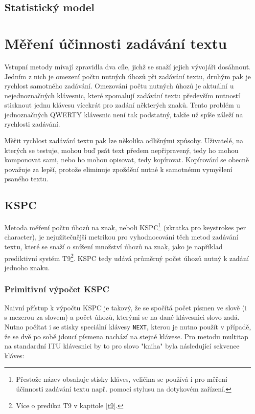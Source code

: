 \documentclass[a4paper,11pt]{article}
\begin{document}
\subsection{Statistický model}


\section{Měření účinnosti zadávání textu}

Vstupní metody mívají zpravidla dva cíle, jichž se snaží jejich vývojáři dosáhnout. Jedním z nich je omezení počtu nutných úhozů při zadávání textu, druhým pak je rychlost samotného zadávání. Omezování počtu nutných úhozů je aktuální u nejednoznačných klávesnic, které zpomalují zadávání textu především nutností stisknout jednu klávesu vícekrát pro zadání některých znaků. Tento problém u jednoznačných QWERTY klávesnic není tak podstatný, takže už spíše záleží na rychlosti zadávání.

Měřit rychlost zadávání textu pak lze několika odlišnými způsoby. Uživatelé, na kterých se testuje, mohou buď psát text předem nepřipravený, tedy ho mohou komponovat sami, nebo ho mohou opisovat, tedy kopírovat. Kopírování se obecně považuje za lepší, protože eliminuje zpoždění nutné k samotnému vymyšlení psaného textu. %

\subsection{KSPC}

Metoda měření počtu úhozů na znak, neboli KSPC\footnote{Přestože název obsahuje stisky kláves, veličina se používá i pro měření účinnosti zadávání textu např. pomocí stylusu na dotykovém zařízení.} (zkratka pro keystrokes per character), je nejužitečnější metrikou pro vyhodnocování těch metod zadávání textu, které se snaží o snížení množství úhozů na znak, jako  je například prediktivní systém T9\footnote{Více o predikci T9 v kapitole \ref{t9}.}. KSPC tedy udává průměrný počet úhozů nutný k zadání jednoho znaku.

\subsubsection{Primitivní výpočet KSPC}

Naivní přístup k výpočtu KSPC je takový, že se spočítá počet písmen ve slově (i s mezerou za slovem) a počet úhozů, kterými se na dané klávesnici slovo zadá. Nutno počítat i se stisky speciální klávesy {\tt NEXT}, kterou je nutno použít v případě, že se dvě po sobě jdoucí písmena nachází na stejné klávese. %
Pro metodu multitap na standardní ITU klávesnici by to pro slovo "kniha" byla následující sekvence kláves:
\end{document}
